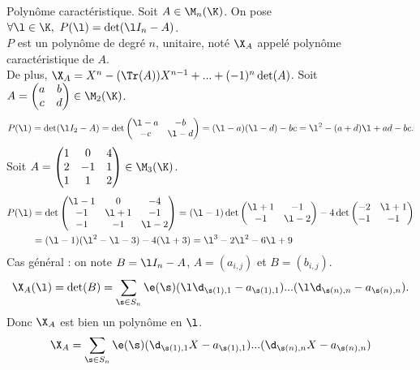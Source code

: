\documentclass[11pt]{article}
\begin{document}
\begin{defi}{Polynôme caractéristique.}{}
    Soit $A\in\M_n(\K)$. On pose $\forall \l \in \K, ~ P(\l)=\det(\l I_n-A)$.\\
    $P$ est un polynôme de degré $n$, unitaire, noté $\X_A$ appelé polynôme caractéristique de $A$.\\
    De plus, $\X_A = X^n-(\Tr(A))X^{n-1}+...+(-1)^n\det(A)$.
    \tcblower
    Soit $A=\begin{pmatrix}a&b\\c&d\end{pmatrix}\in \M_2(\K)$.
    \begin{equation*}
        P(\l)=\det(\l I_2 - A) = \det\begin{pmatrix}\l - a & - b \\ -c & \l - d\end{pmatrix} = (\l-a)(\l-d)-bc=\l^2-(a+d)\l+ad-bc.\\
    \end{equation*}
    Soit $A=\begin{pmatrix}1&0&4\\2&-1&1\\1&1&2\end{pmatrix}\in \M_3(\K)$.
    \begin{align*}
        P(\l)&=\det\begin{pmatrix}\l-1&0&-4\\-1&\l+1&-1\\-1&-1&\l-2\end{pmatrix} = (\l-1)\det\begin{pmatrix}\l+1&-1\\-1&\l-2\end{pmatrix}-4\det\begin{pmatrix}-2&\l+1\\-1&-1\end{pmatrix}\\
        &= (\l-1)(\l^2-\l-3) - 4(\l+3) = \l^3 - 2\l^2 - 6\l + 9 
    \end{align*}
    Cas général : on note $B=\l I_n-A$, $A=(a_{i,j})$ et $B=(b_{i,j})$.
    \begin{equation*}
        \X_A(\l) = \det(B) = \sum_{\s \in S_n}\e(\s)(\l\d_{\s(1),1}-a_{\s(1),1})...(\l\d_{\s(n),n}-a_{\s(n),n}).
    \end{equation*}
    Donc $\X_A$ est bien un polynôme en $\l$.
    \begin{align*}
        \X_A&=\sum_{\s\in S_n}\e(\s)(\d_{\s(1),1}X-a_{\s(1),1})...(\d_{\s(n),n}X-a_{\s(n),n})\\

\end{align*}
\end{defi}
\end{document}
